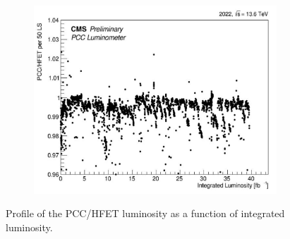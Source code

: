 \begin{itemize}
\begin{figure}[!htp]
  \centering
  \begin{subfigure}[b]{1\textwidth}
    \includegraphics[width=\textwidth]{ashish_thesis/PCC_HFOCvsls_ProfileX_all_2022_1.png}
  \end{subfigure}
  \hfill %
  \caption[Luminosity ratio profile]{Profile of the PCC/HFET luminosity as a function of integrated luminosity.} %
\label{fig:stabprof_78}
\end{figure}



\end{itemize}
